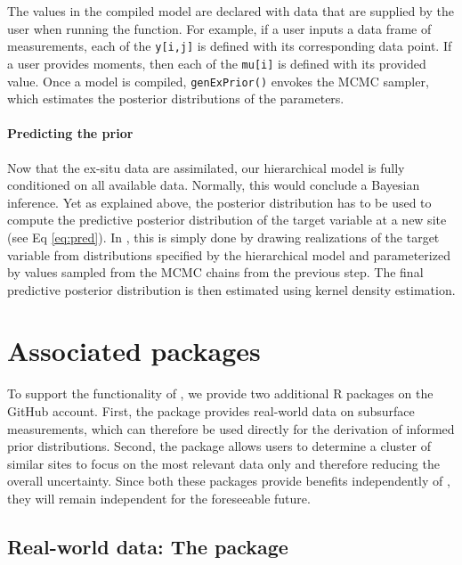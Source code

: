 The values in the compiled model are declared with data that are supplied by the user when running the function. 
For example, if a user inputs a data frame of measurements, each of the \texttt{y[i,j]} is defined with its corresponding data point. 
If a user provides moments, then each of the \texttt{mu[i]} is defined with its provided value. 
Once a model is compiled, \texttt{genExPrior()} envokes the MCMC sampler, which estimates the posterior distributions of the parameters. 

\paragraph{Predicting the prior}

Now that the ex-situ data are assimilated, our hierarchical model is fully conditioned on all available data. 
Normally, this would conclude a Bayesian inference. 
Yet as explained above, the posterior distribution has to be used to compute the predictive posterior distribution of the target variable at a new site (see Eq \ref{eq:pred}). 
In , this is simply done by drawing realizations of the target variable from distributions specified by the hierarchical model and parameterized by values sampled from the MCMC chains from the previous step. 
The final predictive posterior distribution is then estimated using kernel density estimation. 



\section{Associated packages}

To support the functionality of , we provide two additional R packages on the GitHub account.
First, the  package provides real-world data on subsurface measurements, which can therefore be used directly for the derivation of informed prior distributions.
Second, the  package allows users to determine a cluster of similar sites to focus on the most relevant data only and therefore reducing the overall uncertainty.
Since both these packages provide benefits independently of , they will remain independent for the foreseeable future.


\subsection{Real-world data: The  package}

